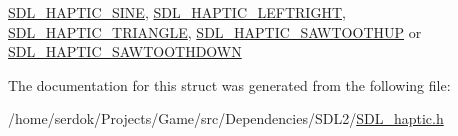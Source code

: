 \hyperlink{SDL__haptic_8h_aa6d75adbfcdda5075078e7a2849da5c0}{S\+D\+L\+\_\+\+H\+A\+P\+T\+I\+C\+\_\+\+S\+I\+NE}, \hyperlink{SDL__haptic_8h_ae047624d8458ff6400887c37a36f86d3}{S\+D\+L\+\_\+\+H\+A\+P\+T\+I\+C\+\_\+\+L\+E\+F\+T\+R\+I\+G\+HT}, \hyperlink{SDL__haptic_8h_ae8123eaa51511507375ba6ef9220fa46}{S\+D\+L\+\_\+\+H\+A\+P\+T\+I\+C\+\_\+\+T\+R\+I\+A\+N\+G\+LE}, \hyperlink{SDL__haptic_8h_ab8e3f40f3c2bcee8905d13b634363c3f}{S\+D\+L\+\_\+\+H\+A\+P\+T\+I\+C\+\_\+\+S\+A\+W\+T\+O\+O\+T\+H\+UP} or \hyperlink{SDL__haptic_8h_afd64aa747034a7ccf4b55f6246525701}{S\+D\+L\+\_\+\+H\+A\+P\+T\+I\+C\+\_\+\+S\+A\+W\+T\+O\+O\+T\+H\+D\+O\+WN} 

The documentation for this struct was generated from the following file\+:\begin{DoxyCompactItemize}
\item 
/home/serdok/\+Projects/\+Game/src/\+Dependencies/\+S\+D\+L2/\hyperlink{SDL__haptic_8h}{S\+D\+L\+\_\+haptic.\+h}\end{DoxyCompactItemize}
